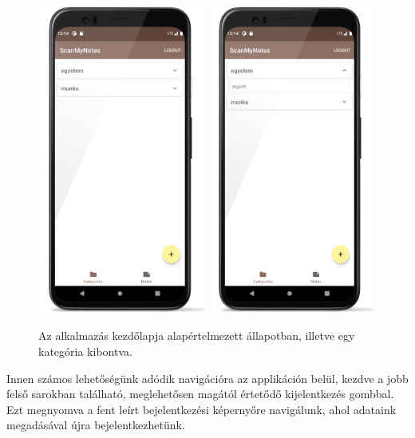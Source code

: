 \begin{figure}[!ht]
	\centering
	\includegraphics[width=55mm, keepaspectratio]{figures/notelist_closed.png}
	\includegraphics[width=55mm, keepaspectratio]{figures/notelist_open.png}
	\caption{Az alkalmazás kezdőlapja alapértelmezett állapotban, illetve egy kategória kibontva.}
	\label{fig:NoteListScreen}
\end{figure}

Innen számos lehetőségünk adódik navigációra az applikáción belül, kezdve a jobb felső sarokban található, meglehetősen magától értetődő kijelentkezés gombbal. Ezt megnyomva a fent leírt bejelentkezési képernyőre navigálunk, ahol adataink megadásával újra bejelentkezhetünk.
\newpage
